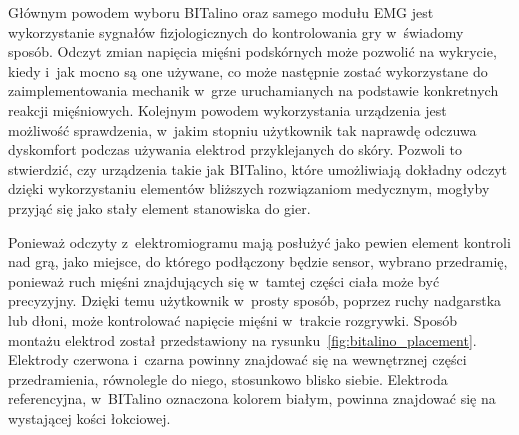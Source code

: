 Głównym powodem wyboru BITalino oraz samego modułu EMG jest wykorzystanie sygnałów fizjologicznych do kontrolowania gry w~świadomy sposób. Odczyt zmian napięcia mięśni podskórnych może pozwolić na wykrycie, kiedy i~jak mocno są one używane, co może następnie zostać wykorzystane do zaimplementowania mechanik w~grze uruchamianych na podstawie konkretnych reakcji mięśniowych. Kolejnym powodem wykorzystania urządzenia jest możliwość sprawdzenia, w~jakim stopniu użytkownik tak naprawdę odczuwa dyskomfort podczas używania elektrod przyklejanych do skóry. Pozwoli to stwierdzić, czy urządzenia takie jak BITalino, które umożliwiają dokładny odczyt dzięki wykorzystaniu elementów bliższych rozwiązaniom medycznym, mogłyby przyjąć się jako stały element stanowiska do gier.

Ponieważ odczyty z~elektromiogramu mają posłużyć jako pewien element kontroli nad grą, jako miejsce, do którego podłączony będzie sensor, wybrano przedramię, ponieważ ruch mięśni znajdujących się w~tamtej części ciała może być precyzyjny. Dzięki temu użytkownik w~prosty sposób, poprzez ruchy nadgarstka lub dłoni, może kontrolować napięcie mięśni w~trakcie rozgrywki. Sposób montażu elektrod został przedstawiony na rysunku~\ref{fig:bitalino_placement}. Elektrody czerwona i~czarna powinny znajdować się na wewnętrznej części przedramienia, równolegle do niego, stosunkowo blisko siebie. Elektroda referencyjna, w~BITalino oznaczona kolorem białym, powinna znajdować się na wystającej kości łokciowej.

